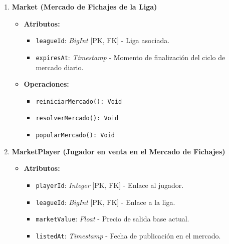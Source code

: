 \begin{enumerate}
    \item \textbf{Market (Mercado de Fichajes de la Liga)}
    \begin{itemize}
        \item \textbf{Atributos:}
            \begin{itemize}
                \item \texttt{leagueId}: \textit{BigInt} [PK, FK] - Liga asociada.
                \item \texttt{expiresAt}: \textit{Timestamp} - Momento de finalización del ciclo de mercado diario.
            \end{itemize}
        \item \textbf{Operaciones:}
            \begin{itemize}
                \item \texttt{reiniciarMercado(): Void}
                \item \texttt{resolverMercado(): Void}                
                \item \texttt{popularMercado(): Void}
            \end{itemize}
    \end{itemize}

    \item \textbf{MarketPlayer (Jugador en venta en el Mercado de Fichajes)}
    \begin{itemize}
        \item \textbf{Atributos:}
            \begin{itemize}
                \item \texttt{playerId}: \textit{Integer} [PK, FK] - Enlace al jugador.
                \item \texttt{leagueId}: \textit{BigInt} [PK, FK] - Enlace a la liga.
                \item \texttt{marketValue}: \textit{Float} - Precio de salida base actual.
                \item \texttt{listedAt}: \textit{Timestamp} - Fecha de publicación en el mercado.
            \end{itemize}
    \end{itemize}


\end{enumerate}
